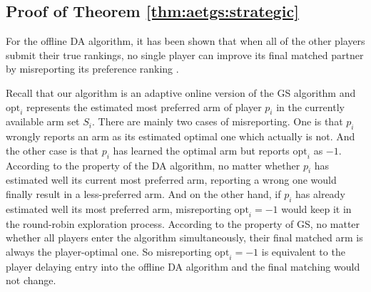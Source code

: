 \subsection{Proof of Theorem \ref{thm:aetgs:strategic}}


    For the offline DA algorithm, it has been shown that when all of the other players submit their true rankings, no single player can improve its final matched partner by misreporting its preference ranking \cite{roth1982economics,dubins1981machiavelli}. 

Recall that our algorithm is an adaptive online version of the GS algorithm and $\mathrm{opt}_i$ represents the estimated most preferred arm of player $p_i$ in the currently available arm set $S_i$.
    There are mainly two cases of misreporting. One is that $p_i$ wrongly reports an arm as its estimated optimal one which actually is not. And the other case is that $p_i$ has learned the optimal arm but reports $\mathrm{opt}_i$ as $-1$. 
     According to the property of the DA algorithm, no matter whether $p_i$ has estimated well its current most preferred arm, reporting a wrong one would finally result in a less-preferred arm. 
    And on the other hand, if $p_i$ has already estimated well its most preferred arm, misreporting $\mathrm{opt}_i=-1$ would keep it in the round-robin exploration process. 
    According to the property of GS, no matter whether all players enter the algorithm simultaneously, their final matched arm is always the player-optimal one. 
    So misreporting $\mathrm{opt}_i=-1$ is equivalent to the player delaying entry into the offline DA algorithm and the final matching would not change. 






